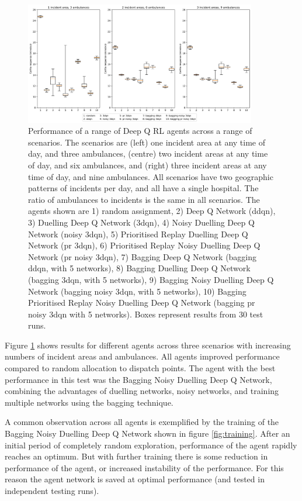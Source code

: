 \documentclass{article}
\begin{document}
\begin{figure}
\centering
\includegraphics[width=0.9\textwidth]{images/assign_to_arrival.jpg}
\caption{Performance of a range of Deep Q RL agents across a range of scenarios. The scenarios are (left) one incident area at any time of day, and three ambulances, (centre) two incident areas at any time of day, and six ambulances, and (right) three incident areas at any time of day, and nine ambulances. All scenarios have two geographic patterns of incidents per day, and all have a single hospital. The ratio of ambulances to incidents is the same in all scenarios. The agents shown are 1) random assignment, 2) Deep Q Network (ddqn), 3) Duelling Deep Q Network (3dqn), 4) Noisy Duelling Deep Q Network (noisy 3dqn), 5) Prioritised Replay Duelling Deep Q Network (pr 3dqn), 6) Prioritised Replay Noisy Duelling Deep Q Network (pr noisy 3dqn), 7) Bagging Deep Q Network (bagging ddqn, with 5 networks), 8) Bagging Duelling Deep Q Network (bagging 3dqn, with 5 networks), 9) Bagging Noisy Duelling Deep Q Network (bagging noisy 3dqn, with 5 networks), 10) Bagging Prioritised Replay Noisy Duelling Deep Q Network (bagging pr noisy 3dqn with 5 networks). Boxes represent results from 30 test runs.}
\label{fig:boxplot}
\end{figure}

Figure \ref{fig:boxplot} shows results for different agents across three scenarios with increasing numbers of incident areas and ambulances. All agents improved performance compared to random allocation to dispatch points. The agent with the best performance in this test was the Bagging Noisy Duelling Deep Q Network, combining the advantages of duelling networks, noisy networks, and training multiple networks using the bagging technique.

A common observation across all agents is exemplified by the training of the Bagging Noisy Duelling Deep Q Network shown in figure \ref{fig:training}. After an initial period of completely random exploration, performance of the agent rapidly reaches an optimum. But with further training there is some reduction in performance of the agent, or increased instability of the performance. For this reason the agent network is saved at optimal performance (and tested in independent testing runs).
\end{document}
